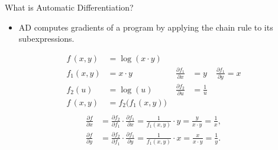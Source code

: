 \documentclass[dvipsnames]{beamer}
\newcommand{\fracp}[2]{\frac{\partial #1}{\partial #2}}
\begin{document}
\begin{frame}[fragile]{What is Automatic Differentiation?}
\begin{itemize}
  \item AD computes gradients of a program by applying the chain rule to its subexpressions.
\end{itemize}
\begin{align*}
f\,(x, y) &= \log(x\cdot y)\\
f_1(x, y) &= x \cdot y &\; \fracp{f_1}{x} &= y &\: \fracp{f_1}{y} = x\\[2pt]
f_2(u) &= \log(u) &\; \fracp{f_2}{u} &= \frac{1}{u}&\\[2pt]
f\,(x,y) &= f_2\!\big(f_1(x,y)\big) \\
\end{align*}
\pause
\vspace{-13mm}
\begin{align*}
\fracp{f}{x}
  &= \fracp{f_2}{f_1} \cdot \fracp{f_1}{x}
   = \frac{1}{f_1(x, y)}\cdot y
   = \frac{y}{x\cdot y}
   = \frac{1}{x},\\[4pt]
\fracp{f}{y}
  &= \fracp{f_2}{f_1} \cdot \fracp{f_1}{y}
   = \frac{1}{f_1(x, y)}\cdot x
   = \frac{x}{x\cdot y}
   = \frac{1}{y}.
\end{align*}
\end{frame}
\end{document}
